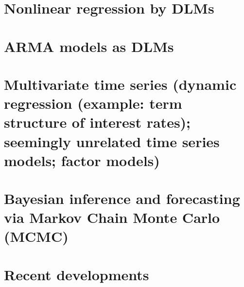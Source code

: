 \documentclass[usenames,dvipsnames,12pt]{book}
\begin{document}
    \chapter{Nonlinear regression by DLMs}

    \chapter{ARMA models as DLMs}

    \chapter[Multivariate time series]{Multivariate time series (dynamic regression (example: term structure of interest rates); seemingly unrelated time series models; factor models)}

    \chapter[Markov Chain Monte Carlo]{Bayesian inference and forecasting via Markov Chain Monte Carlo (MCMC)}
     
    \chapter{Recent developments}
\end{document}
